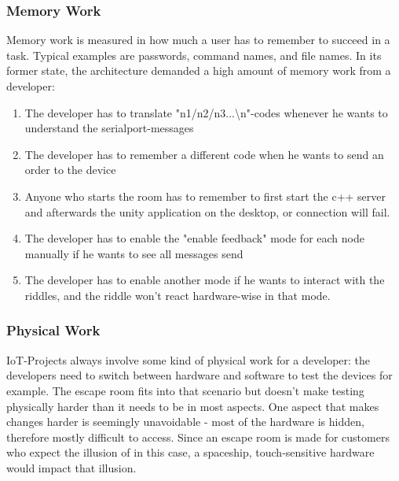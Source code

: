 \subsubsection{Memory Work}
Memory work is measured in how much a user has to remember to succeed in a task. 
Typical examples are passwords, command names, and file names.
In its former state, the architecture demanded a high amount of memory work from a developer:
\begin{enumerate}
    \item The developer has to translate "n1/n2/n3...\textbackslash n"-codes whenever he wants to understand the serialport-messages 
    \item The developer has to remember a different code when he wants to send an order to the device
    \item Anyone who starts the room has to remember to first start the c++ server and afterwards the unity application on the desktop, or connection will fail.
    \item The developer has to enable the "enable feedback" mode for each node manually if he wants to see all messages send
    \item The developer has to enable another mode if he wants to interact with the riddles, and the riddle won't react hardware-wise in that mode.
\end{enumerate} 

\subsubsection{Physical Work}
IoT-Projects always involve some kind of physical work for a developer: the developers need to switch between hardware and software to test the devices for example.
The escape room fits into that scenario but doesn't make testing physically harder than it needs to be in most aspects. 
One aspect that makes changes harder is seemingly unavoidable - most of the hardware is hidden, therefore mostly difficult to access. 
Since an escape room is made for customers who expect the illusion of in this case, a spaceship, 
touch-sensitive hardware would impact that illusion.
